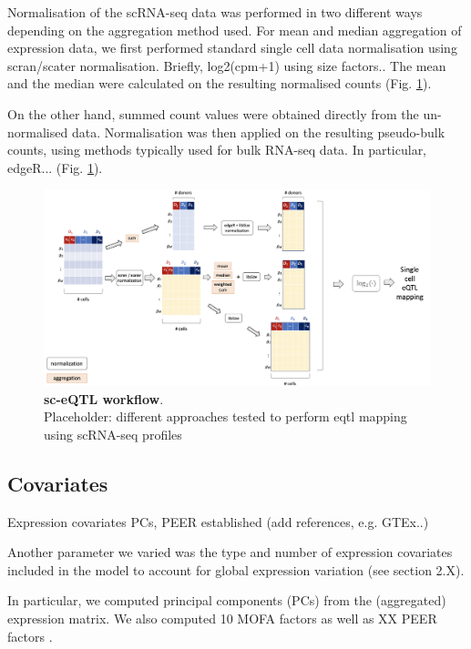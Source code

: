 Normalisation of the scRNA-seq data was performed in two different ways depending on the aggregation method used.
For mean and median aggregation of expression data, we first performed standard single cell data normalisation using scran/scater normalisation.
Briefly, log2(cpm+1) using size factors..
The mean and the median were calculated on the resulting normalised counts (Fig. \ref{fig:sc_qtl_workflow}).

On the other hand, summed count values were obtained directly from the un-normalised data.
Normalisation was then applied on the resulting pseudo-bulk counts, using methods typically used for bulk RNA-seq data.
In particular, edgeR... (Fig. \ref{fig:sc_qtl_workflow}).\\


\begin{figure}[h]
\centering
\includegraphics[width=15cm]{Chapter3/Fig/sc_qtl_workflow.png}
\caption[sc-eQTL workflow]{\textbf{sc-eQTL workflow}.\\
Placeholder: different approaches tested to perform \gls{eqtl} mapping using scRNA-seq profiles}
\label{fig:sc_qtl_workflow}
\end{figure}

\newpage

\subsection{Covariates}

Expression covariates PCs, PEER established (add references, e.g. GTEx..)

Another parameter we varied was the type and number of expression covariates included in the model to account for global expression variation (see section 2.X).

In particular, we computed principal components (PCs) from the (aggregated) expression matrix.
We also computed 10 MOFA factors \cite{argelaguet2018multi} as well as XX PEER factors \cite{stegle2010bayesian,stegle2012using}.

